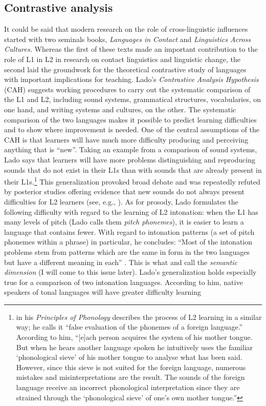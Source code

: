 \subsection{Contrastive analysis}\label{sec:2.4.1} %
\largerpage
It could be said that modern research on the role of cross-linguistic influences started with two seminals books,  \textit{Languages in Contact} and  \textit{Linguistics Across Cultures.} Whereas the first of these texts made an important contribution to the role of L1 in L2 in research on contact linguistics and linguistic change, the second laid the groundwork for the theoretical contrastive study of languages with important implications for teaching. Lado’s \textit{Contrastive Analysis Hypothesis} (CAH) suggests working procedures to carry out the systematic comparison of the L1 and L2, including sound systems, grammatical structures, vocabularies, on one hand, and writing systems and cultures, on the other. The systematic comparison of the two languages makes it possible to predict learning difficulties and to show where improvement is needed. One of the central assumptions of the CAH is that learners will have much more difficulty producing and perceiving anything that is “new”. Taking an example from a comparison of sound systems, Lado says that learners will have more problems distinguishing and reproducing sounds that do not exist in their L1s than with sounds that are already present in their L1s.\footnote{\citet[51--52]{Trubetzkoy1969} in his \textit{Principles of Phonology} describes the process of L2 learning in a similar way; he calls it “false evaluation of the phonemes of a foreign language.” According to him, “[e]ach person acquires the system of his mother tongue. But when he hears another language spoken he intuitively uses the familiar ‘phonological sieve’ of his mother tongue to analyse what has been said. However, since this sieve is not suited for the foreign language, numerous mistakes and misinterpretations are the result. The sounds of the foreign language receive an incorrect phonological interpretation since they are strained through the ‘phonological sieve’ of one’s own mother tongue.”} This generalization provoked broad debate and was repeatedly refuted by posterior studies offering evidence that new sounds do not always present difficulties for L2 learners (see, e.g., \citealt{Flege1987, Flege1995, Brown1998}). As for prosody, Lado formulates the following difficulty with regard to the learning of L2 intonation: when the L1 has many levels of pitch (Lado calls them \textit{pitch phonemes}), it is easier to learn a language that contains fewer. With regard to intonation patterns (a set of pitch phonemes within a phrase) in particular, he concludes: “Most of the intonation problems stem from patterns which are the same in form in the two languages but have a different meaning in each” \citep[44]{Lado1957}. This is what \citet{Ladd1996, Ladd2008} and \citet{Mennen2015} call the \textit{semantic} \textit{dimension} (I will come to this issue later). Lado’s generalization holds especially true for a comparison of two intonation languages. According to him, native speakers of tonal languages will have greater difficulty learning 
